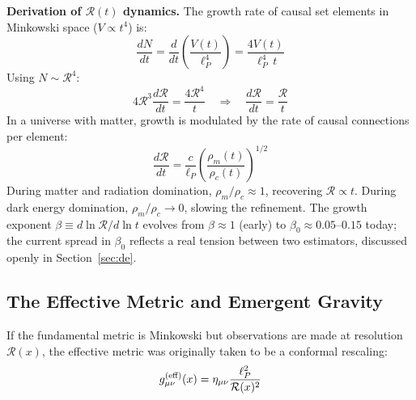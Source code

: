 \documentclass[12pt]{article}
\begin{document}
{\bf Derivation of $\mathcal{R}(t)$ dynamics.} The growth rate of causal set elements in Minkowski space ($V \propto t^4$) is:
\begin{equation}
\frac{dN}{dt} = \frac{d}{dt}\left(\frac{V(t)}{\ell_P^4}\right) = \frac{4V(t)}{\ell_P^4\,t}
\end{equation}
Using $N \sim \mathcal{R}^4$:
\begin{equation}
4\mathcal{R}^3 \frac{d\mathcal{R}}{dt} = \frac{4\mathcal{R}^4}{t} \quad\Rightarrow\quad \frac{d\mathcal{R}}{dt} = \frac{\mathcal{R}}{t}
\end{equation}
In a universe with matter, growth is modulated by the rate of causal connections per element:
\begin{equation}
\frac{d\mathcal{R}}{dt} = \frac{c}{\ell_P} \left(\frac{\rho_m(t)}{\rho_c(t)}\right)^{1/2}
\end{equation}
During matter and radiation domination, $\rho_m/\rho_c \approx 1$, recovering $\mathcal{R} \propto t$. During dark energy domination, $\rho_m/\rho_c \to 0$, slowing the refinement. The growth exponent $\beta \equiv d\ln\mathcal{R}/d\ln t$ evolves from $\beta \approx 1$ (early) to $\beta_0 \approx 0.05$--$0.15$ today; the current spread in $\beta_0$ reflects a real tension between two estimators, discussed openly in Section~\ref{sec:de}.

\subsection{The Effective Metric and Emergent Gravity}
\label{sec:metric}

If the fundamental metric is Minkowski but observations are made at resolution $\mathcal{R}(x)$, the effective metric was originally taken to be a conformal rescaling:
\begin{equation}
g_{\mu\nu}^{\rm (eff)}(x) = \eta_{\mu\nu} \frac{\ell_P^2}{\mathcal{R}(x)^2}
\label{eq:conformal-metric}
\end{equation}
\end{document}
